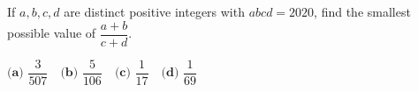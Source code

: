 If $a,b,c,d$ are distinct positive integers with $abcd=2020$, find the smallest possible value of $\dfrac{a+b}{c+d}$.

$\textbf{(a) }\dfrac3{507}\quad\textbf{(b) }\dfrac5{106}\quad\textbf{(c) }\dfrac1{17}\quad\textbf{(d) }\dfrac1{69}$
